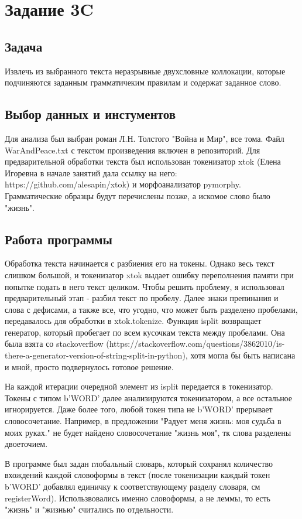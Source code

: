 \documentclass{article}
\begin{document}
    \section{Задание 3C}
    \subsection{Задача}
    Извлечь из выбранного текста неразрывные двухсловные коллокации, которые подчиняются заданным грамматичеким правилам и содержат заданное слово.
    \subsection{Выбор данных и инстументов}
    Для анализа был выбран роман Л.Н. Толстого "Война и Мир", все тома. Файл WarAndPeace.txt с текстом произведения включен в репозиторий. Для предварительной обработки текста был использован токенизатор xtok (Елена Игоревна в начале занятий дала ссылку на него: https://github.com/alesapin/xtok) и морфоанализатор pymorphy. Грамматические образцы будут перечислены позже, а искомое слово было "жизнь".
    \subsection{Работа программы}

    Обработка текста начинается с разбиения его на токены. Однако весь текст слишком большой, и токенизатор xtok выдает ошибку переполнения памяти при попытке подать в него текст целиком. Чтобы решить проблему, я использовал предварительный этап - разбил текст по пробелу. Далее знаки препинания и слова с дефисами, а также все, что угодно, что может быть разделено пробелами, передавалось для обработки в xtok.tokenize. Функция isplit возвращает генератор, который пробегает по всем кусочкам текста между пробелами. Она была взята со stackoverflow (https://stackoverflow.com/questions/3862010/is-there-a-generator-version-of-string-split-in-python), хотя могла бы быть написана и мной, просто подвернулось готовое решение.

    На каждой итерации очередной элемент из isplit передается в токенизатор. Токены с типом b'WORD' далее анализируются токенизатором, а все остальное игнорируется. Даже более того, любой токен типа не b'WORD' прерывает словосочетание. Например, в предложении "Радует меня жизнь: моя судьба в моих руках." не будет найдено словосочетание "жизнь моя", тк слова разделены двоеточием.

    В программе был задан глобальный словарь, который сохранял количество вхождений каждой словоформы в текст (после токенизации каждый токен b'WORD' добавлял единичку к соответствующему разделу словаря, см registerWord). Использвовались именно словоформы, а не леммы, то есть "жизнь" и "жизнью" считались по отдельности.
\end{document}
